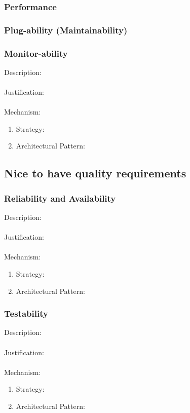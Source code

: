 \documentclass[a4paper,12pt,titlepage]{article}
\begin{document}
\subsubsection{Performance}%
	
	\newpage
\subsubsection{Plug-ability (Maintainability)}%
	
\newpage
\subsubsection{Monitor-ability}%
	Description: \\\\
	Justification: \\\\
	Mechanism:
	\begin{enumerate}
		\item Strategy: 
		\item Architectural Pattern:
	\end{enumerate}
\newpage
\subsection{Nice to have quality requirements}
\subsubsection{Reliability and Availability}%
	Description: \\\\
	Justification: \\\\
	Mechanism:
	\begin{enumerate}
		\item Strategy: 
		\item Architectural Pattern:
	\end{enumerate}
\subsubsection{Testability}%
	Description: \\\\
	Justification: \\\\
	Mechanism:
	\begin{enumerate}
		\item Strategy: 
		\item Architectural Pattern:
	\end{enumerate}
\newpage
\end{document}
